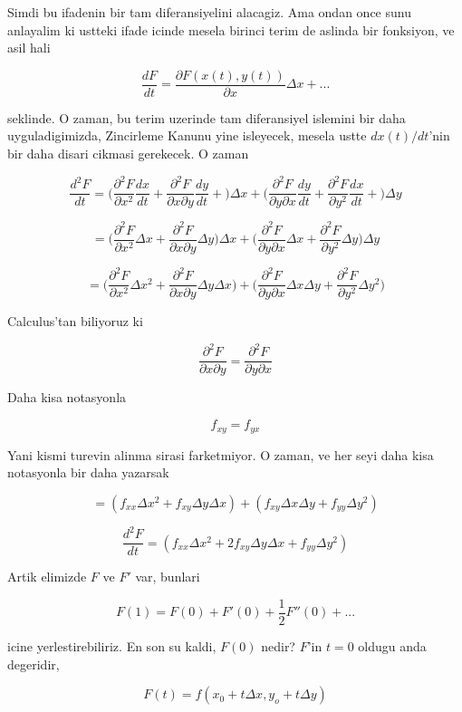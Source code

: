 \documentclass[12pt,fleqn]{article}\usepackage{../common}
\begin{document}
Simdi bu ifadenin bir tam diferansiyelini alacagiz. Ama ondan once sunu
anlayalim ki ustteki ifade icinde mesela birinci terim de aslinda bir
fonksiyon, ve asil hali

\[ \frac{dF}{dt} = \frac{\partial F(x(t),y(t))}{\partial x}\Delta x + ...
 \]

seklinde. O zaman, bu terim uzerinde tam diferansiyel islemini bir daha
uyguladigimizda, Zincirleme Kanunu yine isleyecek, mesela ustte $dx(t)/dt$'nin 
bir daha disari cikmasi gerekecek. O zaman 

\[ \frac{d^2F}{dt} =
\bigg(
\frac{\partial ^2 F}{\partial x^2}\frac{dx}{dt} + 
\frac{\partial ^2 F}{\partial x \partial y}\frac{dy}{dt} + 
\bigg) \Delta x +
\bigg(
\frac{\partial ^2 F}{\partial y \partial x}\frac{dy}{dt} + 
\frac{\partial ^2 F}{\partial y^2}\frac{dx}{dt} + 
\bigg) \Delta y 
\]

\[ =
\bigg(
\frac{\partial ^2 F}{\partial x^2}\Delta x + 
\frac{\partial ^2 F}{\partial x \partial y}\Delta y 
\bigg) \Delta x +
\bigg(
\frac{\partial ^2 F}{\partial y \partial x}\Delta x + 
\frac{\partial ^2 F}{\partial y^2}\Delta y 
\bigg) \Delta y 
 \]

\[ =
\bigg(
\frac{\partial ^2 F}{\partial x^2}\Delta x^2 + 
\frac{\partial ^2 F}{\partial x \partial y}\Delta y \Delta x
\bigg) +
\bigg(
\frac{\partial ^2 F}{\partial y \partial x}\Delta x \Delta y + 
\frac{\partial ^2 F}{\partial y^2}\Delta y^2
\bigg) 
 \]

Calculus'tan biliyoruz ki 

\[ 
\frac{\partial ^2 F}{\partial x \partial y} = 
\frac{\partial ^2 F}{\partial y \partial x} 
 \]

Daha kisa notasyonla

\[ f_{xy} = f_{yx} \]

Yani kismi turevin alinma sirasi farketmiyor. O zaman, ve her seyi daha
kisa notasyonla bir daha yazarsak

\[ =
(f_{xx}\Delta x^2 + f_{xy}\Delta y \Delta x ) +
(f_{xy}\Delta x \Delta y + f_{yy}\Delta y^2 )
 \]

\[
\frac{d^2F}{dt}  =
(f_{xx}\Delta x^2 + 2f_{xy}\Delta y \Delta x + f_{yy}\Delta y^2 )
 \]

Artik elimizde $F$ ve $F'$ var, bunlari 

\[ F(1) = F(0) + F'(0) + \frac{1}{2}F''(0) + ... \]

icine yerlestirebiliriz. En son su kaldi, $F(0)$ nedir? $F$'in $t=0$ oldugu
anda degeridir, 

\[ F(t) = f(x_0 + t\Delta x, y_o + t\Delta y) \]
\end{document}
